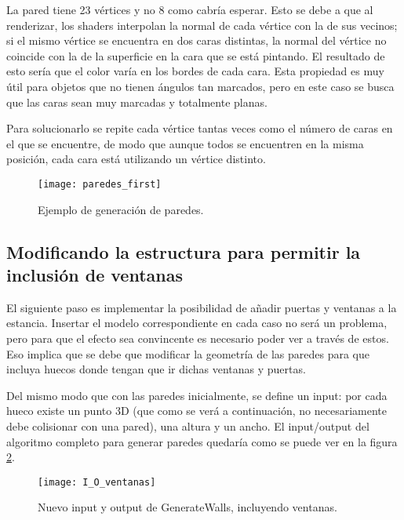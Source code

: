 La pared tiene 23 vértices y no 8 como cabría esperar. Esto se debe a que al renderizar, los shaders interpolan la normal de cada vértice con la de sus vecinos; si el mismo vértice se encuentra en dos caras distintas, la normal del vértice no coincide con la de la superficie en la cara que se está pintando. El resultado de esto sería que el color varía en los bordes de cada cara. Esta propiedad es muy útil para objetos que no tienen ángulos tan marcados, pero en este caso se busca que las caras sean muy marcadas y totalmente planas.

Para solucionarlo se repite cada vértice tantas veces como el número de caras en el que se encuentre, de modo que aunque todos se encuentren en la misma posición, cada cara está utilizando un vértice distinto.

\begin{figure}[H]
    \centering
    \texttt{[image: paredes\_first]}
    \caption{Ejemplo de generación de paredes.}
    \label{fig:paredes_first}
\end{figure}

\subsection{Modificando la estructura para permitir la inclusión de ventanas}
\label{subsec:gen2}
El siguiente paso es implementar la posibilidad de añadir puertas y ventanas a la estancia. Insertar el modelo correspondiente en cada caso no será un problema, pero para que el efecto sea convincente es necesario poder ver a través de estos. Eso implica que se debe que modificar la geometría de las paredes para que incluya huecos donde tengan que ir dichas ventanas y puertas.

Del mismo modo que con las paredes inicialmente, se define un input: por cada hueco existe un punto 3D (que como se verá a continuación, no necesariamente debe colisionar con una pared), una altura y un ancho. El input/output del algoritmo completo para generar paredes quedaría como se puede ver en la figura \ref{fig:io_generatewindows}.

\begin{figure}[H]
    \centering
    \texttt{[image: I\_O\_ventanas]}
    \caption{Nuevo input y output de GenerateWalls, incluyendo ventanas.}
    \label{fig:io_generatewindows}
\end{figure}


